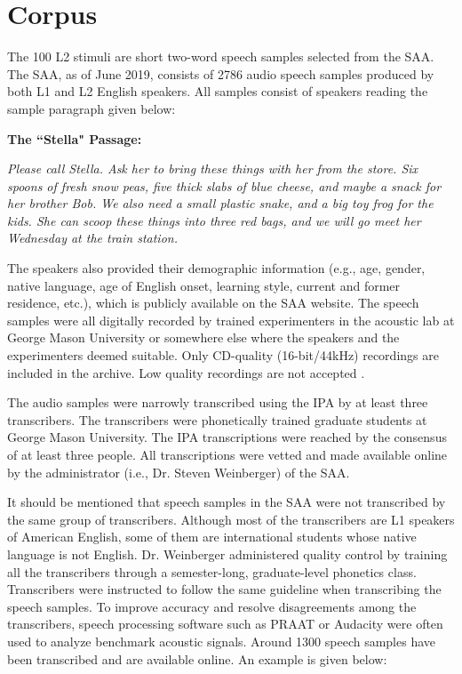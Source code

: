 \section{Corpus}

The 100 L2 stimuli are short two-word speech samples selected from the SAA. The SAA, as of June 2019, consists of 2786 audio speech samples produced by both L1 and L2 English speakers. All samples consist of speakers reading the sample paragraph given below:

\bigskip
\noindent \textbf{The ``Stella" Passage:}

\noindent \textit{Please call Stella. Ask her to bring these things with her from the store. Six spoons of fresh snow peas, five thick slabs of blue cheese, and maybe a snack for her brother Bob. We also need a small plastic snake, and a big toy frog for the kids. She can scoop these things into three red bags, and we will go meet her Wednesday at the train station.}
\bigskip

The speakers also provided their demographic information (e.g., age, gender, native language, age of English onset, learning style, current and former residence, etc.), which is publicly available on the SAA website. The speech samples were all digitally recorded by trained experimenters in the acoustic lab at George Mason University or somewhere else where the speakers and the experimenters deemed suitable. Only CD-quality (16-bit/44kHz) recordings are included in the archive. Low quality recordings are not accepted \citep{Weinberger_2011}.

The audio samples were narrowly transcribed using the IPA by at least three transcribers. The transcribers were phonetically trained graduate students at George Mason University. The IPA transcriptions were reached by the consensus of at least three people. All transcriptions were vetted and made available online by the administrator (i.e., Dr. Steven Weinberger) of the SAA. 

It should be mentioned that speech samples in the SAA were not transcribed by the same group of transcribers. Although most of the transcribers are L1 speakers of American English, some of them are international students whose native language is not English. Dr. Weinberger administered quality control by training all the transcribers through a semester-long, graduate-level phonetics class. Transcribers were instructed to follow the same guideline when transcribing the speech samples. To improve accuracy and resolve disagreements among the transcribers, speech processing software such as PRAAT \citep{Boersma_2015} or Audacity \citep{Mazzoni_2000} were often used to analyze benchmark acoustic signals. Around 1300 speech samples have been transcribed and are available online. An example is given below:

